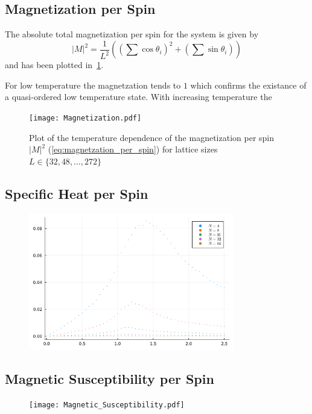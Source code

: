 \subsection{Magnetization per Spin}
The absolute total magnetization per spin for the system is given by
\begin{equation}\label{eq:magnetzation_per_spin}
	{\lvert M \rvert}^2 = \frac{1}{L^2} \left( \left( \sum{\cos{\theta_i}} \right)^2 + \left( \sum{\sin{\theta_i}} \right) \right)
\end{equation}
and has been plotted in~\cref{fig:magnetization_per_spin}.

For low temperature the magnetzation tends to $\num{1}$ which confirms the existance of a quasi-ordered low temperature state. With increasing temperature the 
\begin{figure}[hbt!]
	\centering
	\texttt{[image: Magnetization.pdf]}
	\caption[Temperature dependence of the magnetzation per spin $E$]{Plot of the temperature dependence of the magnetization per spin ${\lvert M \rvert}^2$ (\cref{eq:magnetzation_per_spin}) for lattice sizes $L\in\{32, 48, \dots, 272\}$}
	\label{fig:magnetization_per_spin}
\end{figure}

\subsection{Specific Heat per Spin}
\begin{figure}[H]
	\centering
	\includegraphics[width=0.8\textwidth]{Specific_Heat.pdf}
\end{figure}

\subsection{Magnetic Susceptibility per Spin}
\begin{figure}[H]
	\centering
	\texttt{[image: Magnetic\_Susceptibility.pdf]}
\end{figure}

